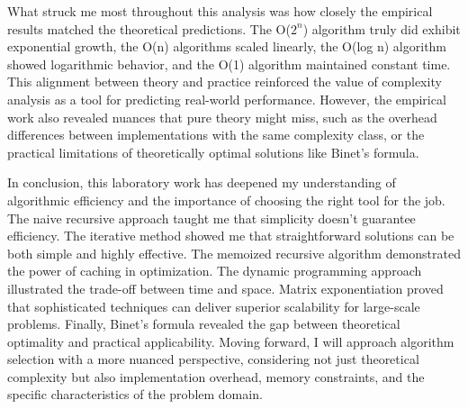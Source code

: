 \documentclass[12pt]{article}
\begin{document}
What struck me most throughout this analysis was how closely the empirical results matched the theoretical predictions. The O($2^n$) algorithm truly did exhibit exponential growth, the O(n) algorithms scaled linearly, the O(log n) algorithm showed logarithmic behavior, and the O(1) algorithm maintained constant time. This alignment between theory and practice reinforced the value of complexity analysis as a tool for predicting real-world performance. However, the empirical work also revealed nuances that pure theory might miss, such as the overhead differences between implementations with the same complexity class, or the practical limitations of theoretically optimal solutions like Binet's formula.

In conclusion, this laboratory work has deepened my understanding of algorithmic efficiency and the importance of choosing the right tool for the job. The naive recursive approach taught me that simplicity doesn't guarantee efficiency. The iterative method showed me that straightforward solutions can be both simple and highly effective. The memoized recursive algorithm demonstrated the power of caching in optimization. The dynamic programming approach illustrated the trade-off between time and space. Matrix exponentiation proved that sophisticated techniques can deliver superior scalability for large-scale problems. Finally, Binet's formula revealed the gap between theoretical optimality and practical applicability. Moving forward, I will approach algorithm selection with a more nuanced perspective, considering not just theoretical complexity but also implementation overhead, memory constraints, and the specific characteristics of the problem domain.
\end{document}
